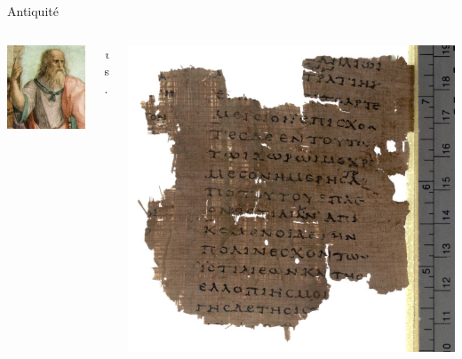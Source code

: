 \begin{frame}{Antiquité}
\begin{columns}
	\begin{column}{0.40\linewidth}
		\centering
		\includegraphics[height=0.35\paperheight]{../resources/illustrations/plato} \\
	\end{column}
	\begin{column}{0.09\linewidth} \centering \huge \emph vs. \end{column}
	\begin{column}{0.40\linewidth}
		\centering
		\includegraphics[height=0.35\paperheight]{../resources/illustrations/histories-fragment} \\
	\end{column}

\end{columns}
\end{frame}
